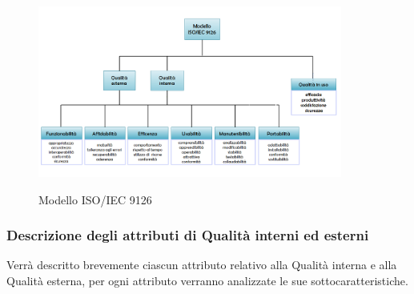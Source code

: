 \documentclass[../piano-di-qualifica.tex]{subfiles}
\begin{document}
\begin{figure}[H]
    \centering
    \includegraphics[width=10cm]{img/Modello_ISO-IEC_9126.png}
    \label{fig:modello_iso_eic_9126}
    \caption{Modello ISO/IEC 9126}
\end{figure}

\subsubsection{Descrizione degli attributi di Qualità interni ed esterni}%
\label{sec:descrizione_attributi_interni_esterni}
Verrà descritto brevemente ciascun attributo relativo alla Qualità interna e alla Qualità esterna, per ogni attributo verranno analizzate le sue sottocaratteristiche.
\end{document}
